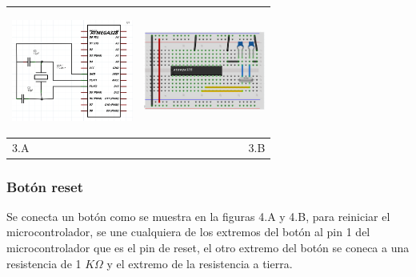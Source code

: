 \documentclass[12]{article}
\newenvironment{Figure}
{\par\medskip\noindent\minipage{\linewidth}}
{\endminipage\par\medskip}
\begin{document}
\begin{multicols}{2}
\begin{Figure}
\center
\begin{tabular}{|l|r|}
\hline
\includegraphics[width=4cm, height=4cm]{img/oscilaesq.png} & \includegraphics[width=4cm, height=4cm]{img/oscilapro.png} \\ \hline
3.A & 3.B \\ \hline
\end{tabular}
\label{fig:g3}
\end{Figure}

\subsubsection{Botón reset}
Se conecta un  botón como se muestra en la figuras 4.A y 4.B, para reiniciar el  microcontrolador, se une cualquiera de los  extremos del botón al pin 1 del microcontrolador que es el pin de reset, el otro extremo del botón se coneca  a una resistencia de 1 $K\Omega $ y el extremo de la resistencia a tierra.\\


\end{multicols}
\end{document}
